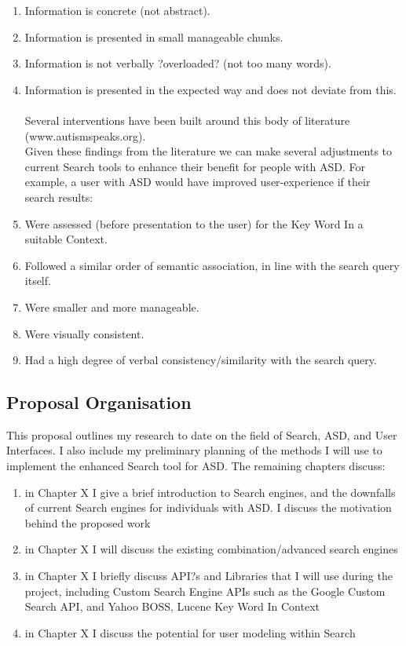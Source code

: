 \documentclass[11pt]{article}
\begin{document}
\begin{enumerate}
\item Information is concrete (not abstract).\\
\item Information is presented in small manageable chunks.\\
\item Information is not verbally ?overloaded? (not too many words).\\
\item Information is presented in the expected way and does not deviate from this.\\
\\Several interventions have been built around this body of literature (www.autismspeaks.org).\\
Given these findings from the literature we can make several adjustments to current Search tools to enhance their benefit for people with ASD. For example, a user with ASD would have improved user-experience if their search results:\\
\item Were assessed (before presentation to the user) for the Key Word In a suitable Context.\\
\item Followed a similar order of semantic association, in line with the search query itself. \\
\item Were smaller and more manageable.\\
\item Were visually consistent.\\
\item Had a high degree of verbal consistency/similarity with the search query.\\
\end{enumerate}

\subsection{Proposal Organisation}

This proposal outlines my research to date on the field of Search, ASD, and User Interfaces. I also include my preliminary planning of the methods I will use to implement the enhanced Search tool for ASD. The remaining chapters discuss:
\begin{enumerate}
\item in Chapter X I give a brief introduction to Search engines, and the downfalls of current Search engines for individuals with ASD. I discuss the motivation behind the proposed work
\item in Chapter X I will discuss the existing combination/advanced search engines
\item in Chapter X I briefly discuss API?s and Libraries that I will use during the project, including Custom Search Engine APIs such as the Google Custom Search API, and Yahoo BOSS, Lucene Key Word In Context
\item in Chapter X I discuss the potential for user modeling within Search
\end{enumerate}
\end{document}
